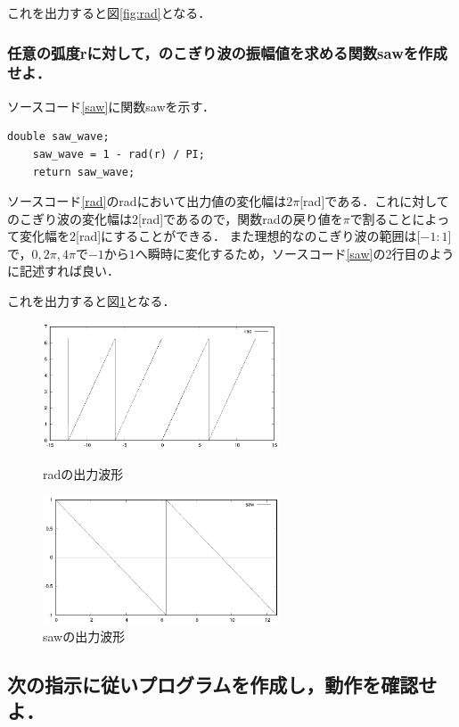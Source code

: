 \documentclass[titlepage]{jarticle}
\begin{document}
これを出力すると図\ref{fig:rad}となる．

\subsubsection{任意の弧度rに対して，のこぎり波の振幅値を求める関数sawを作成せよ．}
ソースコード\ref{saw}に関数sawを示す．
\begin{lstlisting}[caption=double saw(double r),label=saw]
    double saw_wave;
    saw_wave = 1 - rad(r) / PI;
    return saw_wave;
   \end{lstlisting}
ソースコード\ref{rad}のradにおいて出力値の変化幅は$2\pi$[rad]である．これに対してのこぎり波の変化幅は$2$[rad]であるので，関数radの戻り値を$\pi$で割ることによって変化幅を$2$[rad]にすることができる．
また理想的なのこぎり波の範囲は[$-1:1$]で，$0,2\pi,4\pi$で$-1$から$1$へ瞬時に変化するため，ソースコード\ref{saw}の2行目のように記述すれば良い．

これを出力すると図\ref{fig:saw}となる．
\begin{figure}[H]
  \begin{minipage}{0.495\hsize}
    \centering
    \includegraphics[width=7cm]{EPS/rad1.eps}
    \caption{radの出力波形}
    \label{fig:rad}
  \end{minipage}
  \begin{minipage}{0.495\hsize}
    \centering
    \includegraphics[width=7cm]{EPS/saw1.eps}
    \caption{sawの出力波形}
    \label{fig:saw}
  \end{minipage}
\end{figure}
\subsection{次の指示に従いプログラムを作成し，動作を確認せよ．}
\end{document}
